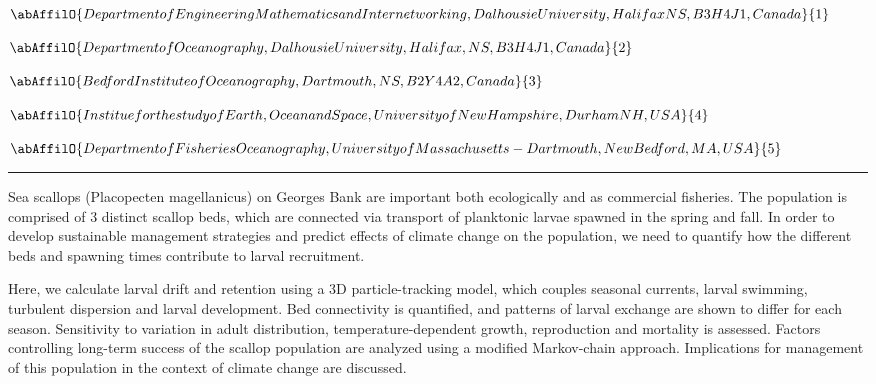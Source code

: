 \begin{minipage}{\linewidth}\begin{center}\begin{minipage}{\linewidth}
   \vspace{2 mm} \begin{center}
    \vspace{2 mm}\begin{center}
  
  $\abAffilO{Department of Engineering Mathematics and Internetworking, Dalhousie University, Halifax NS, B3H 4J1, Canada}{1}$

  
  $\abAffilO{Department of Oceanography, Dalhousie University, Halifax, NS, B3H 4J1, Canada}{2}$

  
  $\abAffilO{Bedford Institute of Oceanography, Dartmouth, NS, B2Y 4A2, Canada}{3}$

  
  $\abAffilO{Institue for the study of Earth, Ocean and Space, University of New Hampshire, Durham NH, USA}{4}$

  
  $\abAffilO{Department of Fisheries Oceanography, University of Massachusetts-Dartmouth, New Bedford, MA, USA}{5}$

  \end{center}
  \vspace{2 mm}
  \end{center}\end{minipage}\end{center}
  \begin{center}\rule{0.70\linewidth}{0.5 pt}\end{center}
  \begin{minipage}{\linewidth}
\noindent Sea scallops (Placopecten magellanicus) on Georges Bank are important both ecologically and as commercial fisheries. The population is comprised of 3 distinct scallop beds, which are connected via transport of planktonic larvae spawned in the spring and fall. In order to develop sustainable management strategies and predict effects of climate change on the population, we need to quantify how the different beds and spawning times contribute to larval recruitment. 

Here, we calculate larval drift and retention using a 3D particle-tracking model, which couples seasonal currents, larval swimming, turbulent dispersion and larval development. Bed connectivity is quantified, and patterns of larval exchange are shown to differ for each season. Sensitivity to variation in adult distribution, temperature-dependent growth, reproduction and mortality is assessed. Factors controlling long-term success of the scallop population are analyzed using a modified Markov-chain approach. Implications for management of this population in the context of climate change are discussed.
\end{minipage}\end{minipage}

